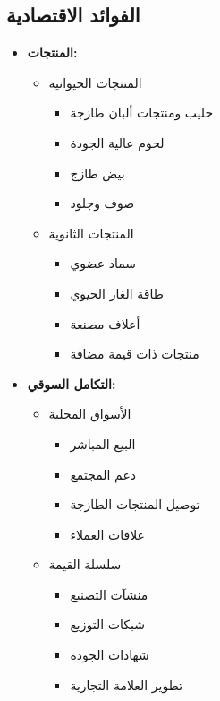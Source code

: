 \subsection{الفوائد الاقتصادية}
\begin{itemize}
    \item \textbf{المنتجات:}
    \begin{itemize}
        \item المنتجات الحيوانية
        \begin{itemize}
            \item حليب ومنتجات ألبان طازجة
            \item لحوم عالية الجودة
            \item بيض طازج
            \item صوف وجلود
        \end{itemize}
        
        \item المنتجات الثانوية
        \begin{itemize}
            \item سماد عضوي
            \item طاقة الغاز الحيوي
            \item أعلاف مصنعة
            \item منتجات ذات قيمة مضافة
        \end{itemize}
    \end{itemize}
    
    \item \textbf{التكامل السوقي:}
    \begin{itemize}
        \item الأسواق المحلية
        \begin{itemize}
            \item البيع المباشر
            \item دعم المجتمع
            \item توصيل المنتجات الطازجة
            \item علاقات العملاء
        \end{itemize}
        
        \item سلسلة القيمة
        \begin{itemize}
            \item منشآت التصنيع
            \item شبكات التوزيع
            \item شهادات الجودة
            \item تطوير العلامة التجارية
        \end{itemize}
    \end{itemize}
\end{itemize}

